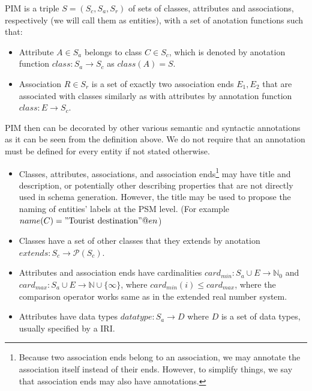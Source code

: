 \begin{definition}[PIM] PIM is a triple $S=(S_c, S_a, S_r)$ of sets of classes, attributes and associations, respectively (we will call them as entities), with a set of anotation functions such that:
    \begin{itemize}
        \item Attribute $A \in S_a$ belongs to class $C \in S_c$, which is denoted by anotation function ${class}: S_a \rightarrow S_c$ as ${class}(A)=S$.
        \item Association $R \in S_r$ is a set of exactly two association ends ${E_1, E_2}$ that are associated with classes similarly as with attributes by annotation function ${class}: E \rightarrow S_c$.
    \end{itemize}

    PIM then can be decorated by other various semantic and syntactic annotations as it can be seen from the definition above. We do not require that an annotation must be defined for every entity if not stated otherwise. %

    \begin{itemize}
        \item Classes, attributes, associations, and association ends\footnote{Because two association ends belong to an association, we may annotate the association itself instead of their ends. However, to simplify things, we say that association ends may also have annotations.} may have title and description, or potentially other describing properties that are not directly used in schema generation. However, the title may be used to propose the naming of entities' labels at the PSM level. (For example $name(C)="\textrm{Tourist destination}"@en$)
        \item Classes have a set of other classes that they extends by anotation $extends: S_c \rightarrow \mathcal{P}(S_c)$.
        \item Attributes and association ends have cardinalities $card_{min}: S_a \cup E \rightarrow \mathds{N}_0$ and $card_{max}: S_a \cup E \rightarrow \mathds{N} \cup \{\infty\}$, where $card_{min}(i) \leq card_{max}$, where the comparison operator works same as in the extended real number system.
        \item Attributes have data types $datatype: S_a \rightarrow D$ where $D$ is a set of data types, usually specified by a IRI.
    \end{itemize}
\end{definition}

